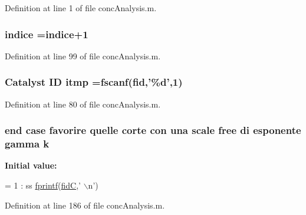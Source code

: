Definition at line 1 of file conc\-Analysis.\-m.

\hypertarget{a00019_a776b2bbd08be028d44f6d4260f27633a}{
\subsubsection[{indice}]{ indice =indice+1}}\label{a00019_a776b2bbd08be028d44f6d4260f27633a}


Definition at line 99 of file conc\-Analysis.\-m.

\hypertarget{a00019_af17812863fb385a507b5b07ed6166569}{
\subsubsection[{itmp}]{\setlength{\rightskip}{0pt plus 5cm}Catalyst I\-D itmp ={\bf fscanf}({\bf fid},'\%d',1)}}\label{a00019_af17812863fb385a507b5b07ed6166569}


Definition at line 80 of file conc\-Analysis.\-m.

\hypertarget{a00019_ab7005e24e9bb6ea9b6e14c4ac2614a31}{
\subsubsection[{k}]{ {\bf end} case favorire quelle corte con una scale free di esponente gamma k}}\label{a00019_ab7005e24e9bb6ea9b6e14c4ac2614a31}
{\bfseries Initial value\-:}
\begin{DoxyCode}
= 1 : ss    
            \hyperlink{a00021_a21172d88d238291f06b91067ea53f814}{fprintf}(\hyperlink{a00019_a5650dbe23ad9065391c1ea56f8acd34c}{fidC},\textcolor{stringliteral}{' \(\backslash\)n'})
\end{DoxyCode}


Definition at line 186 of file conc\-Analysis.\-m.

